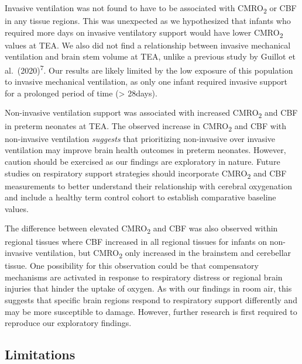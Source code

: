 \documentclass[
  letterpaper,
  DIV=11,
  numbers=noendperiod]{scrartcl}
\begin{document}
Invasive ventilation was not found to have to be associated with
CMRO\textsubscript{2} or CBF in any tissue regions. This was unexpected
as we hypothesized that infants who required more days on invasive
ventilatory support would have lower CMRO\textsubscript{2} values at
TEA. We also did not find a relationship between invasive mechanical
ventilation and brain stem volume at TEA, unlike a previous study by
Guillot et al.~(2020)\textsuperscript{7}. Our results are likely limited
by the low exposure of this population to invasive mechanical
ventilation, as only one infant required invasive support for a
prolonged period of time (\textgreater{} 28days).

Non-invasive ventilation support was associated with increased
CMRO\textsubscript{2} and CBF in preterm neonates at TEA. The observed
increase in CMRO\textsubscript{2} and CBF with non-invasive ventilation
\emph{suggests} that prioritizing non-invasive over invasive ventilation
may improve brain health outcomes in preterm neonates. However, caution
should be exercised as our findings are exploratory in nature. Future
studies on respiratory support strategies should incorporate
CMRO\textsubscript{2} and CBF measurements to better understand their
relationship with cerebral oxygenation and include a healthy term
control cohort to establish comparative baseline values.

The difference between elevated CMRO\textsubscript{2} and CBF was also
observed within regional tissues where CBF increased in all regional
tissues for infants on non-invasive ventilation, but
CMRO\textsubscript{2} only increased in the brainstem and cerebellar
tissue. One possibility for this observation could be that compensatory
mechanisms are activated in response to respiratory distress or regional
brain injuries that hinder the uptake of oxygen. As with our findings in
room air, this suggests that specific brain regions respond to
respiratory support differently and may be more susceptible to damage.
However, further research is first required to reproduce our exploratory
findings.

\subsection{Limitations}\label{limitations}
\end{document}
